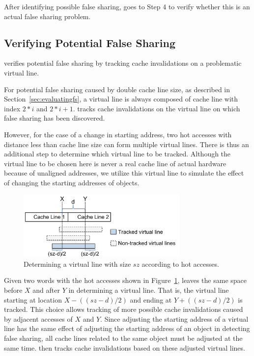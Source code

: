   
After identifying possible false sharing, \Predator{} goes to Step 4 to 
verify whether this is an actual false sharing problem.

\subsection{Verifying Potential False Sharing}
\label{sec:tracking}

\Predator{} verifies potential false sharing by tracking 
cache invalidations on a problematic virtual line.

For potential false sharing caused by double cache line size, as described in
Section~\ref{sec:evaluatingfs}, a virtual line is always composed of 
cache line with index $2*i$ and $2*i+1$. 
\Predator{} tracks cache invalidations
on the virtual line on which false sharing has been discovered.

However, for the case of a change in starting address,
two hot accesses with distance less than cache line size 
can form multiple virtual lines. 
There is thus an additional step to determine which virtual line to be tracked.
Although the virtual line to be chosen here is never a real cache line of actual hardware
because of unaligned addresses,
we utilize this virtual line to simulate the effect of changing the 
starting addresses of objects.


\begin{figure}
\begin{center} 
\includegraphics[width=3.3in]{predator/figure/trackpotential}
\end{center}
\caption{Determining a virtual line with size $sz$ according to hot accesses.}
\label{fig:trackpotential}
\end{figure}

Given two words with the hot accesses shown in Figure~\ref{fig:trackpotential}, 
\Predator{} leaves the same space before $X$ and after $Y$ in determining a virtual line. 
That is, the virtual line starting 
at location $X-((sz-d)/2)$ and ending at $Y+((sz-d)/2)$ is tracked. 
This choice allows tracking of more possible cache invalidations caused by
adjacent accesses of $X$ and $Y$. 
Since adjusting the starting address of a virtual line has the same effect of
adjusting the starting address of an object in detecting false sharing,
all cache lines related to the same object must be adjusted at the same time.
\Predator{} then tracks cache invalidations based on these adjusted virtual lines.

